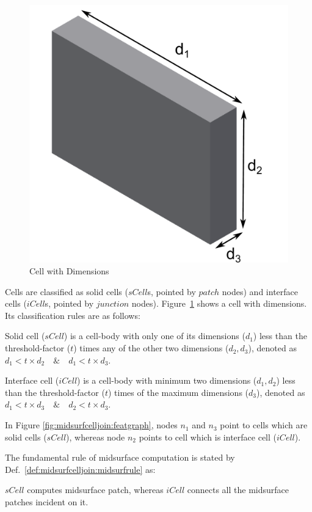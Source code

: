  \begin{figure}[!h]
\centering     %
\includegraphics[width=0.3\linewidth,valign=t]{images/InventorCell.pdf}
\caption{Cell with Dimensions}
\label{fig:litsurvey:celldim}
\end{figure}

Cells are classified as solid cells ($sCell$s, pointed by $patch$ nodes) and interface cells ($iCell$s, pointed by $junction$ nodes). Figure~\ref{fig:litsurvey:celldim} shows a cell with dimensions. Its classification rules are as follows:







\begin{mydef}
\label{def:midsurfcelljoin:scell}
Solid cell ($sCell$) is a cell-body with only one of its dimensions ($d_1$) less than the threshold-factor ($t$) times any of the other two dimensions ($d_2, d_3$), denoted as  $d_1 < t \times d_2 \quad \&  \quad d_1 < t \times d_3$. %
\end{mydef}
\begin{mydef}
\label{def:midsurfcelljoin:icell}
Interface cell ($iCell$) is a cell-body with minimum two dimensions ($d_1,d_2$) less than the threshold-factor ($t$) times of the maximum dimensions ($d_3$), denoted as  $d_1 < t \times d_3 \quad \&  \quad d_2 < t  \times d_3$. %
\end{mydef}


In Figure \ref{fig:midsurfcelljoin:featgraph}, nodes $n_1$ and $n_3$ point to cells which are solid cells ($sCell$), whereas node $n_2$ points to cell which is interface cell ($iCell$).  

The fundamental rule of midsurface computation is stated by Def.~\ref{def:midsurfcelljoin:midsurfrule} as:

\begin{mydef}
\label{def:midsurfcelljoin:midsurfrule}
$sCell$ computes midsurface patch, whereas $iCell$ connects all the midsurface patches incident on it.
\end{mydef}			

